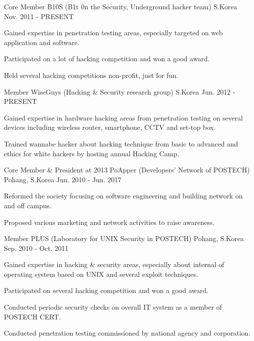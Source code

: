 \documentclass[11pt, a4paper]{../awesome-cv}
\begin{document}
\begin{cventries}

\cventry
    {Core Member} {B10S (B1t 0n the Security, Underground hacker team)} {S.Korea} {Nov. 2011 - PRESENT} {
      \begin{cvitems} \item {Gained expertise in penetration testing areas, especially targeted on web application and software.}
        \item {Participated on a lot of hacking competition and won a good award.}
        \item {Held several hacking competitions non-profit, just for fun.}
      \end{cvitems}
    }

\cventry
    {Member} {WiseGuys (Hacking \& Security research group)} {S.Korea} {Jun. 2012 - PRESENT} {
      \begin{cvitems} \item {Gained expertise in hardware hacking areas from penetration testing on several devices including wireless router, smartphone, CCTV and set-top box.}
        \item {Trained wannabe hacker about hacking technique from basic to advanced and ethics for white hackers by hosting annual Hacking Camp.}
      \end{cvitems}
    }

\cventry
    {Core Member \& President at 2013} {PoApper (Developers' Network of POSTECH)} {Pohang, S.Korea} {Jun. 2010 - Jun. 2017} {
      \begin{cvitems} \item {Reformed the society focusing on software engineering and building network on and off campus.}
        \item {Proposed various marketing and network activities to raise awareness.}
      \end{cvitems}
    }

\cventry
    {Member} {PLUS (Laboratory for UNIX Security in POSTECH)} {Pohang, S.Korea} {Sep. 2010 - Oct. 2011} {
      \begin{cvitems} \item {Gained expertise in hacking \& security areas, especially about internal of operating system based on UNIX and several exploit techniques.}
        \item {Participated on several hacking competition and won a good award.}
        \item {Conducted periodic security checks on overall IT system as a member of POSTECH CERT.}
        \item {Conducted penetration testing commissioned by national agency and corporation.}
      \end{cvitems}
    }


\end{cventries}
\end{document}
